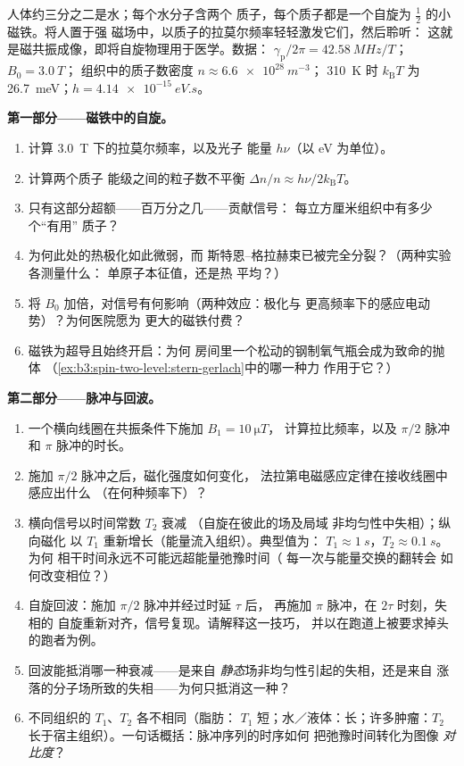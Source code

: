 \begin{problem}\label{pb:b3:spin-two-level:1}
人体约三分之二是水；每个水分子含两个
质子，每个质子都是一个自旋为 $\tfrac12$ 的小磁铁。将人置于强
磁场中，以质子的拉莫尔频率轻轻激发它们，然后聆听：
这就是磁共振成像，即将自旋物理用于医学。数据：
$\gamma_{\text{p}}/2\pi = \qty{42.58}{MHz/T}$；$B_0 = \qty{3.0}{T}$；
组织中的质子数密度 $n \approx \qty{6.6e28}{m^{-3}}$；
\qty{310}{K} 时 $k_{\text{B}}T$ 为 \qty{26.7}{meV}；$h =
\qty{4.14e-15}{eV.s}$。

\medskip\noindent\textbf{第一部分——磁铁中的自旋。}
\begin{enumerate}
  \item 计算 \qty{3.0}{T} 下的拉莫尔频率，以及光子
        能量 $h\nu$（以 eV 为单位）。
  \item 计算两个质子
        能级之间的粒子数不平衡 $\Delta n/n \approx h\nu/2k_{\text{B}}T$。
  \item 只有这部分超额——百万分之几——贡献信号：
        每立方厘米组织中有多少个“有用”
        质子？
  \item 为何此处的热极化如此微弱，而
        斯特恩–格拉赫束已被完全分裂？（两种实验各测量什么：
        单原子本征值，还是热
        平均？）
  \item 将 $B_0$ 加倍，对信号有何影响（两种效应：极化与
        更高频率下的感应电动势）？为何医院愿为
        更大的磁铁付费？
  \item 磁铁为超导且始终开启：为何
        房间里一个松动的钢制氧气瓶会成为致命的抛体
        （\cref{ex:b3:spin-two-level:stern-gerlach}中的哪一种力
        作用于它？）
\end{enumerate}

\medskip\noindent\textbf{第二部分——脉冲与回波。}
\begin{enumerate}[resume]
  \item 一个横向线圈在共振条件下施加 $B_1 = \qty{10}{\micro T}$，
        计算拉比频率，以及
        $\pi/2$ 脉冲和 $\pi$ 脉冲的时长。
  \item 施加 $\pi/2$ 脉冲之后，磁化强度如何变化，
        法拉第电磁感应定律在接收线圈中感应出什么
        （在何种频率下）？
  \item 横向信号以时间常数 $T_2$ 衰减
        （自旋在彼此的场及局域
        非均匀性中失相）；纵向磁化
        以 $T_1$ 重新增长（能量流入组织）。典型值为：
        $T_1 \approx \qty{1}{s}$，$T_2 \approx \qty{0.1}{s}$。为何
        相干时间永远不可能远超能量弛豫时间（
        每一次与能量交换的翻转会
        如何改变相位？）
  \item 自旋回波：施加 $\pi/2$ 脉冲并经过时延 $\tau$ 后，
        再施加 $\pi$ 脉冲，在 $2\tau$ 时刻，失相的
        自旋重新对齐，信号复现。请解释这一技巧，
        并以在跑道上被要求掉头的跑者为例。
  \item 回波能抵消哪一种衰减——是来自
        \emph{静态}场非均匀性引起的失相，还是来自
        涨落的分子场所致的失相——为何只抵消这一种？
  \item 不同组织的 $T_1$、$T_2$ 各不相同（脂肪：
        $T_1$ 短；水／液体：长；许多肿瘤：$T_2$
        长于宿主组织）。一句话概括：脉冲序列的时序如何
        把弛豫时间转化为图像
        \emph{对比度}？
\end{enumerate}


\end{problem}
